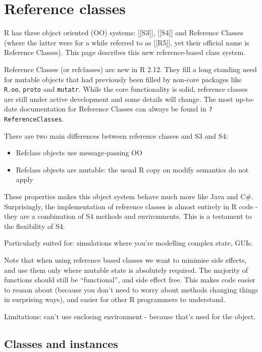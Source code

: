 \chapter{Reference classes}

R has three object oriented (OO) systems: {[}{[}S3{]}{]}, {[}{[}S4{]}{]}
and Reference Classes (where the latter were for a while referred to as
{[}{[}R5{]}{]}, yet their official name is Reference Classes). This page
describes this new reference-based class system.

Reference Classes (or refclasses) are new in R 2.12. They fill a long
standing need for mutable objects that had previously been filled by
non-core packages like \texttt{R.oo}, \texttt{proto} and
\texttt{mutatr}. While the core functionality is solid, reference
classes are still under active development and some details will change.
The most up-to-date documentation for Reference Classes can always be
found in \texttt{?ReferenceClasses}.

There are two main differences between reference classes and S3 and S4:

\begin{itemize}
\itemsep1pt\parskip0pt
\item
  Refclass objects use message-passing OO
\item
  Refclass objects are mutable: the usual R copy on modify semantics do
  not apply
\end{itemize}

These properties makes this object system behave much more like Java and
C\#. Surprisingly, the implementation of reference classes is almost
entirely in R code - they are a combination of S4 methods and
environments. This is a testament to the flexibility of S4.

Particularly suited for: simulations where you're modelling complex
state, GUIs.

Note that when using reference based classes we want to minimise side
effects, and use them only where mutable state is absolutely required.
The majority of functions should still be ``functional'', and side
effect free. This makes code easier to reason about (because you don't
need to worry about methods changing things in surprising ways), and
easier for other R programmers to understand.

Limitations: can't use enclosing environment - because that's used for
the object.

\section{Classes and instances}

